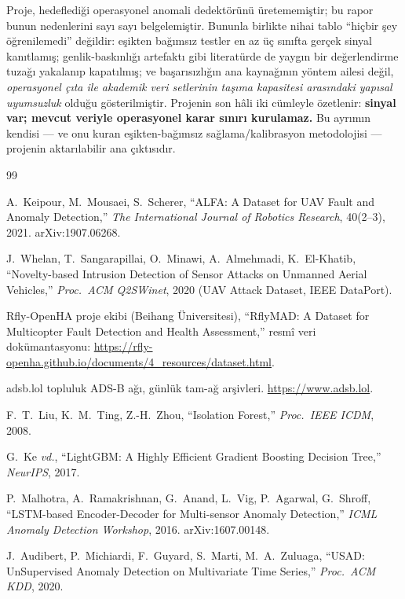 \documentclass[11pt,a4paper]{article}
\newcommand{\etal}{\emph{vd.}}
\begin{document}
Proje, hedeflediği operasyonel anomali dedektörünü üretememiştir; bu rapor
bunun nedenlerini sayı sayı belgelemiştir. Bununla birlikte nihai tablo
``hiçbir şey öğrenilemedi'' değildir: eşikten bağımsız testler en az üç
sınıfta gerçek sinyal kanıtlamış; genlik-baskınlığı artefaktı gibi literatürde
de yaygın bir değerlendirme tuzağı yakalanıp kapatılmış; ve başarısızlığın ana
kaynağının yöntem ailesi değil, \emph{operasyonel çıta ile akademik veri
setlerinin taşıma kapasitesi arasındaki yapısal uyumsuzluk} olduğu
gösterilmiştir. Projenin son hâli iki cümleyle özetlenir: \textbf{sinyal var;
mevcut veriyle operasyonel karar sınırı kurulamaz.} Bu ayrımın kendisi ---
ve onu kuran eşikten-bağımsız sağlama/kalibrasyon metodolojisi --- projenin
aktarılabilir ana çıktısıdır.

\begin{thebibliography}{99}\small

A.~Keipour, M.~Mousaei, S.~Scherer,
``ALFA: A Dataset for UAV Fault and Anomaly Detection,''
\emph{The International Journal of Robotics Research}, 40(2--3), 2021.
arXiv:1907.06268.

J.~Whelan, T.~Sangarapillai, O.~Minawi, A.~Almehmadi, K.~El-Khatib,
``Novelty-based Intrusion Detection of Sensor Attacks on Unmanned Aerial
Vehicles,'' \emph{Proc.\ ACM Q2SWinet}, 2020 (UAV Attack Dataset, IEEE
DataPort).

Rfly-OpenHA proje ekibi (Beihang Üniversitesi),
``RflyMAD: A Dataset for Multicopter Fault Detection and Health Assessment,''
resmî veri dokümantasyonu:
\url{https://rfly-openha.github.io/documents/4_resources/dataset.html}.

adsb.lol topluluk ADS-B ağı, günlük tam-ağ arşivleri.
\url{https://www.adsb.lol}.

F.~T.~Liu, K.~M.~Ting, Z.-H.~Zhou,
``Isolation Forest,'' \emph{Proc.\ IEEE ICDM}, 2008.

G.~Ke \etal{},
``LightGBM: A Highly Efficient Gradient Boosting Decision Tree,''
\emph{NeurIPS}, 2017.

P.~Malhotra, A.~Ramakrishnan, G.~Anand, L.~Vig, P.~Agarwal, G.~Shroff,
``LSTM-based Encoder-Decoder for Multi-sensor Anomaly Detection,''
\emph{ICML Anomaly Detection Workshop}, 2016. arXiv:1607.00148.

J.~Audibert, P.~Michiardi, F.~Guyard, S.~Marti, M.~A.~Zuluaga,
``USAD: UnSupervised Anomaly Detection on Multivariate Time Series,''
\emph{Proc.\ ACM KDD}, 2020.


\end{thebibliography}
\end{document}
